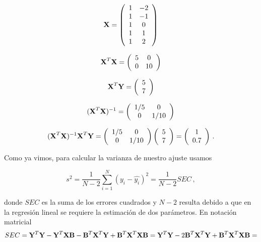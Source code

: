 \documentclass[
]{agujournal2019}
\begin{document}
\[{\textbf X}=\left(\begin{array}{cc}
  1 & -2 \\
  1 & -1 \\
  1 & 0 \\
  1 & 1 \\
  1 & 2\\
        \end{array}\right)\]

\[{\textbf X}^T{\textbf X}= \left(\begin{array}{ccccc}
   5 &  0 \\
  0 & 10 \\
        \end{array}\right)\]

\[{\textbf X}^T{\textbf Y}= \left(\begin{array}{ccccc}
   5  \\
  7  \\
        \end{array}\right)\]

\[({\textbf X}^T{\textbf X})^{-1}= \left(\begin{array}{ccccc}
   1/5 &  0 \\
   0 & 1/10 \\
        \end{array}\right)\]

\[ ({\textbf X}^T{\textbf X})^{-1}{\textbf X}^T{\textbf Y}=
    \left(\begin{array}{ccccc}
   1/5 &  0 \\
   0 & 1/10 \\
        \end{array}\right)\left(\begin{array}{ccccc}
   5  \\
  7  \\
        \end{array}\right)=
    \left(\begin{array}{ccccc}
   1  \\
  0.7  \\
        \end{array}\right)\,.\]

\vspace{0.5cm}

Como ya vimos, para calcular la varianza de nuestro ajuste usamos

\[s^2=\frac{1}{N-2}\sum\limits^N_{i=1}(y_i-\hat{y_i})^2=\frac{1}{N-2}SEC\,,\]

donde \(SEC\) es la suma de los errores cuadrados y \(N-2\) resulta
debido a que en la regresión lineal se requiere la estimación de dos
parámetros. En notación matricial
\[SEC={\textbf Y}^T{\textbf Y} - {\textbf Y}^T{\textbf X}{\textbf B}-{\textbf B}^T{\textbf X}^T{\textbf Y}+{\textbf B}^T
{\textbf X}^T{\textbf X}{\textbf B}=
{\textbf Y}^T{\textbf Y}-2{\textbf B}^T{\textbf X}^T{\textbf Y}+{\textbf B}^T{\textbf X}^T{\textbf X}{\textbf B}=\]
\end{document}
